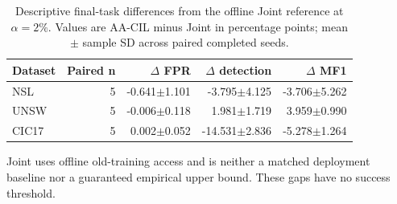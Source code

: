 \begin{table}[t]
\centering\scriptsize
\setlength{\tabcolsep}{3.8pt}
\caption{Descriptive final-task differences from the offline Joint reference at $\alpha=2\%$. Values are AA-CIL minus Joint in percentage points; mean $\pm$ sample SD across paired completed seeds.}\label{tab:joint-gaps}
\begin{tabular}{lrrrr}
\toprule
Dataset & Paired n & $\Delta$ FPR & $\Delta$ detection & $\Delta$ MF1 \\
\midrule
NSL & 5 & -0.641$\pm$1.101 & -3.795$\pm$4.125 & -3.706$\pm$5.262 \\
UNSW & 5 & -0.006$\pm$0.118 & 1.981$\pm$1.719 & 3.959$\pm$0.990 \\
CIC17 & 5 & 0.002$\pm$0.052 & -14.531$\pm$2.836 & -5.278$\pm$1.264 \\
\bottomrule
\end{tabular}
\par\vspace{2pt}\begin{minipage}{.98\linewidth}\footnotesize Joint uses offline old-training access and is neither a matched deployment baseline nor a guaranteed empirical upper bound. These gaps have no success threshold.\end{minipage}
\end{table}
